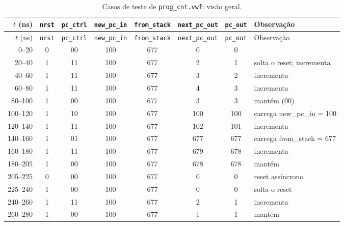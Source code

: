 {\scriptsize\setlength{\tabcolsep}{3pt}
\begin{longtable}{rccccccp{4.2cm}}
\caption{Casos de teste de \texttt{prog\_cnt.vwf}: visão geral.}
\label{tab:caso-prog-cnt}\\
\hline $t$ (ns) & \texttt{nrst} & \texttt{pc\_ctrl} & \texttt{new\_pc\_in} & \texttt{from\_stack} & \texttt{next\_pc\_out} & \texttt{pc\_out} & Observação \\ \hline \endfirsthead
\hline $t$ (ns) & \texttt{nrst} & \texttt{pc\_ctrl} & \texttt{new\_pc\_in} & \texttt{from\_stack} & \texttt{next\_pc\_out} & \texttt{pc\_out} & Observação \\ \hline \endhead
0--20 & 0 & 00 & 100 & 677 & 0 & 0 &  \\
20--40 & 1 & 11 & 100 & 677 & 2 & 1 & solta o reset; incrementa \\
40--60 & 1 & 11 & 100 & 677 & 3 & 2 & incrementa \\
60--80 & 1 & 11 & 100 & 677 & 4 & 3 & incrementa \\
80--100 & 1 & 00 & 100 & 677 & 3 & 3 & mantém (00) \\
100--120 & 1 & 10 & 100 & 677 & 100 & 100 & carrega new\_pc\_in = 100 \\
120--140 & 1 & 11 & 100 & 677 & 102 & 101 & incrementa \\
140--160 & 1 & 01 & 100 & 677 & 677 & 677 & carrega from\_stack = 677 \\
160--180 & 1 & 11 & 100 & 677 & 679 & 678 & incrementa \\
180--205 & 1 & 00 & 100 & 677 & 678 & 678 & mantém \\
205--225 & 0 & 00 & 100 & 677 & 0 & 0 & reset assíncrono \\
225--240 & 1 & 00 & 100 & 677 & 0 & 0 & solta o reset \\
240--260 & 1 & 11 & 100 & 677 & 2 & 1 & incrementa \\
260--280 & 1 & 00 & 100 & 677 & 1 & 1 & mantém \\
\hline
\end{longtable}}
\vspace{-0.9cm}
